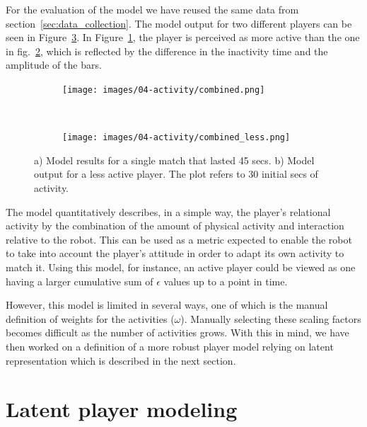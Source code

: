 For the evaluation of the model we have reused the same data from section~\ref{sec:data_collection}. The model output for two different players can be seen in Figure~\ref{fig:model_output}. In Figure~\ref{fig:fun}, the player is perceived as more active than the one in fig.~\ref{fig:nofun}, which is reflected by the difference in the inactivity time and the amplitude of the bars.

\begin{figure}[h]
    \centering 
	\begin{subfigure}[h]{5cm}
		\centering      
		\texttt{[image: images/04-activity/combined.png]}
		\caption{}
		\label{fig:fun}
	\end{subfigure}
	~
	\begin{subfigure}[h]{5cm}
		\centering      
      	\texttt{[image: images/04-activity/combined\_less.png]}
      	\caption{}
      	\label{fig:nofun}
     \end{subfigure}
      \caption{a) Model results for a single match that lasted 45 secs. b) Model output for a less active player. The plot refers to 30 initial secs of activity.}		
      \label{fig:model_output}
\end{figure}

The model quantitatively describes, in a simple way, the player's relational activity by the combination of the amount of physical activity and interaction relative to the robot. This can be used as a metric expected to enable the robot to take into account the player's attitude in order to adapt its own activity to match it. Using this model, for instance, an active player could be viewed as one having a larger cumulative sum of $\epsilon$ values up to a point in time.

However, this model is limited in several ways, %
one of which is the manual definition of weights for the activities ($\omega$). Manually selecting these scaling factors becomes difficult as the number of activities grows. With this in mind, we have then worked on a definition of a more robust player model relying on latent representation which is described in the next section.

\section{Latent player modeling}

